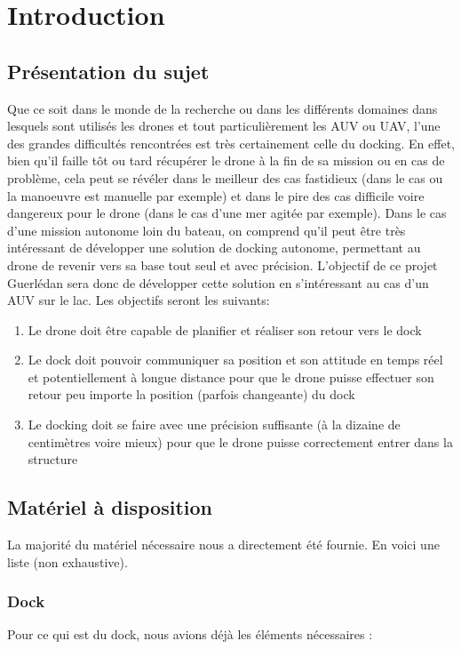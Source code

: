 \documentclass[12pt]{report}
\begin{document}


\tableofcontents

\chapter{Introduction}

\section{Présentation du sujet}

Que ce soit dans le monde de la recherche ou dans les différents domaines dans lesquels sont utilisés les drones et tout particulièrement les AUV ou UAV, l'une des grandes difficultés rencontrées est très certainement celle du docking. En effet, bien qu'il faille tôt ou tard récupérer le drone à la fin de sa mission ou en cas de problème, cela peut se révéler dans le meilleur des cas fastidieux (dans le cas ou la manoeuvre est manuelle par exemple) et dans le pire des cas difficile voire dangereux pour le drone (dans le cas d'une mer agitée par exemple). Dans le cas d'une mission autonome loin du bateau, on comprend qu'il peut être très intéressant de développer une solution de docking autonome, permettant au drone de revenir vers sa base tout seul et avec précision. L'objectif de ce projet Guerlédan sera donc de développer cette solution en s'intéressant au cas d'un AUV sur le lac. Les objectifs seront les suivants:

\begin{enumerate}
    \item Le drone doit être capable de planifier et réaliser son retour vers le dock
    \item Le dock doit pouvoir communiquer sa position et son attitude en temps réel et potentiellement à longue distance pour que le drone puisse effectuer son retour peu importe la position (parfois changeante) du dock
    \item Le docking doit se faire avec une précision suffisante (à la dizaine de centimètres voire mieux) pour que le drone puisse correctement entrer dans la structure
\end{enumerate}

\section{Matériel à disposition}
La majorité du matériel nécessaire nous a directement été fournie. En voici une liste (non exhaustive).
\subsection{Dock}
Pour ce qui est du dock, nous avions déjà les éléments nécessaires :
\end{document}
